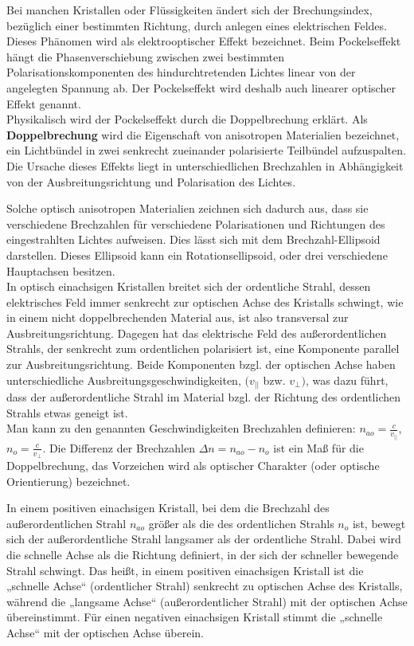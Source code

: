 \documentclass[12pt]{article}
\begin{document}
Bei manchen Kristallen oder Flüssigkeiten ändert sich der Brechungsindex, bezüglich einer bestimmten Richtung, durch anlegen eines elektrischen Feldes. Dieses Phänomen wird als elektrooptischer Effekt bezeichnet. Beim Pockelseffekt hängt die Phasenverschiebung zwischen zwei bestimmten Polarisationskomponenten des hindurchtretenden Lichtes linear von der angelegten Spannung ab. Der Pockelseffekt wird deshalb auch linearer optischer Effekt genannt.\\

Physikalisch wird der Pockelseffekt durch die Doppelbrechung erklärt.
Als \textbf{Doppelbrechung} wird die Eigenschaft von anisotropen Materialien bezeichnet, ein Lichtbündel in zwei senkrecht zueinander polarisierte Teilbündel aufzuspalten. Die Ursache dieses Effekts liegt in unterschiedlichen Brechzahlen in Abhängigkeit von der Ausbreitungsrichtung und Polarisation des Lichtes.

Solche optisch anisotropen Materialien zeichnen sich dadurch aus, dass sie verschiedene Brechzahlen für verschiedene Polarisationen und Richtungen des eingestrahlten Lichtes aufweisen. Dies lässt sich mit dem Brechzahl-Ellipsoid darstellen. Dieses Ellipsoid kann ein Rotationsellipsoid, oder drei verschiedene Hauptachsen besitzen. \\

In optisch einachsigen Kristallen breitet sich der ordentliche Strahl, dessen elektrisches Feld immer senkrecht zur optischen Achse des Kristalls schwingt, wie in einem nicht doppelbrechenden Material aus, ist also transversal zur Ausbreitungsrichtung. Dagegen hat das elektrische Feld des außerordentlichen Strahls, der senkrecht zum ordentlichen polarisiert ist, eine Komponente parallel zur Ausbreitungsrichtung. Beide Komponenten bzgl. der optischen Achse haben unterschiedliche Ausbreitungsgeschwindigkeiten, $(v_{||}$ bzw. $v_{\bot})$, was dazu führt, dass der außerordentliche Strahl im Material bzgl. der Richtung des ordentlichen Strahls etwas geneigt ist.\\

Man kann zu den genannten Geschwindigkeiten Brechzahlen definieren: $n_{ao} = \frac{c}{v_{||}}$, $n_o = \frac{c}{v_{\bot}}$. Die Differenz der Brechzahlen $\Delta n = n_{ao} - n_o$ ist ein Maß für die Doppelbrechung, das Vorzeichen wird als optischer Charakter (oder optische Orientierung) bezeichnet.

In einem positiven einachsigen Kristall, bei dem die Brechzahl des außerordentlichen Strahl $n_{ao}$ größer als die des ordentlichen Strahls $n_o$ ist, bewegt sich der außerordentliche Strahl langsamer als der ordentliche Strahl. Dabei wird die schnelle Achse als die Richtung definiert, in der sich der schneller bewegende Strahl schwingt. Das heißt, in einem positiven einachsigen Kristall ist die „schnelle Achse“ (ordentlicher Strahl) senkrecht zu optischen Achse des Kristalls, während die „langsame Achse“ (außerordentlicher Strahl) mit der optischen Achse übereinstimmt. Für einen negativen einachsigen Kristall stimmt die „schnelle Achse“ mit der optischen Achse überein. \\
\end{document}
